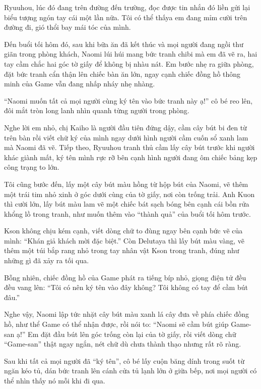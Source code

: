 \documentclass[../main.tex]{subfiles}
\begin{document}
Ryuuhou, lúc đó đang trên đường đến trường, đọc được tin nhắn đó liền gửi lại biểu tượng ngón tay cái một lần nữa. Tôi có thể thấya em đang mỉm cười trên đường đi, gió thổi bay mái tóc của mình.

\ct

Đến buổi tối hôm đó, sau khi bữa ăn đã kết thúc và mọi người đang ngồi thư giãn trong phòng khách, Naomi lúi húi mang bức tranh chibi mà em đã vẽ ra, hai tay cầm chắc hai góc tờ giấy để không bị nhàu nát. Em bước nhẹ ra giữa phòng, đặt bức tranh cẩn thận lên chiếc bàn ăn lớn, ngay cạnh chiếc đồng hồ thông minh của Game vẫn đang nhấp nháy nhẹ nhàng.

``Naomi muốn tất cả mọi người cùng ký tên vào bức tranh này ạ!'' cô bé reo lên, đôi mắt tròn long lanh nhìn quanh từng người trong phòng.

Nghe lời em nhỏ, chị Kaiho là người đầu tiên đứng dậy, cầm cây bút bi đen từ trên bàn rồi viết chữ ký của mình ngay dưới hình người cầm cuốn sổ xanh lam mà Naomi đã vẽ. Tiếp theo, Ryuuhou tranh thủ cầm lấy cây bút trước khi người khác giành mất, ký tên mình rực rỡ bên cạnh hình người đang ôm chiếc bảng kẹp công trạng to lớn.

Tôi cũng bước đến, lấy một cây bút màu hồng từ hộp bút của Naomi, vẽ thêm một trái tim nhỏ xinh ở góc dưới cùng của tờ giấy, nơi còn trống trải. Anh Kuon thì cười lớn, lấy bút màu lam vẽ một chiếc bát sạch bóng bên cạnh cái bồn rửa khổng lồ trong tranh, như muốn thêm vào ``thành quả'' của buổi tối hôm trước.

Kson không chịu kém cạnh, viết dòng chữ to đùng ngay bên cạnh bức vẽ của mình: ``Khán giả khách mời đặc biệt.'' Còn Delutaya thì lấy bút màu vàng, vẽ thêm một túi bắp rang nhỏ trong tay nhân vật Kson trong tranh, đúng như những gì đã xảy ra tối qua.

Bỗng nhiên, chiếc đồng hồ của Game phát ra tiếng bíp nhỏ, giọng điện tử đều đều vang lên: ``Tôi có nên ký tên vào đây không? Tôi không có tay để cầm bút đâu.''

Nghe vậy, Naomi lập tức nhặt cây bút màu xanh lá cây đưa về phía chiếc đồng hồ, như thể Game có thể nhận được, rồi nói to: ``Naomi sẽ cầm bút giúp Game-san ạ!'' Em đặt đầu bút lên góc trống còn lại của tờ giấy, rồi viết dòng chữ ``Game-san'' thật ngay ngắn, nét chữ dù chưa thành thạo nhưng rất rõ ràng.

Sau khi tất cả mọi người đã ``ký tên'', cô bé lấy cuộn băng dính trong suốt từ ngăn kéo tủ, dán bức tranh lên cánh cửa tủ lạnh lớn ở giữa bếp, nơi mọi người có thể nhìn thấy nó mỗi khi đi qua.
\end{document}
